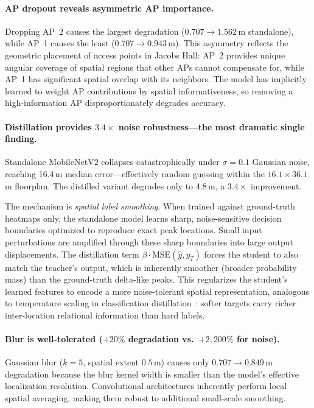 \documentclass[11pt,a4paper]{article}
\begin{document}
\paragraph{AP dropout reveals asymmetric AP importance.}
Dropping AP~2 causes the largest degradation ($0.707 \to 1.562$\,m standalone), while AP~1 causes the least ($0.707 \to 0.943$\,m).
This asymmetry reflects the geometric placement of access points in Jacobs Hall: AP~2 provides unique angular coverage of spatial regions that other APs cannot compensate for, while AP~1 has significant spatial overlap with its neighbors.
The model has implicitly learned to weight AP contributions by spatial informativeness, so removing a high-information AP disproportionately degrades accuracy.

\paragraph{Distillation provides $3.4\times$ noise robustness---the most dramatic single finding.}
Standalone MobileNetV2 collapses catastrophically under $\sigma = 0.1$ Gaussian noise, reaching 16.4\,m median error---effectively random guessing within the $16.1 \times 36.1$\,m floorplan.
The distilled variant degrades only to 4.8\,m, a $3.4\times$ improvement.

The mechanism is \emph{spatial label smoothing}.
When trained against ground-truth heatmaps only, the standalone model learns sharp, noise-sensitive decision boundaries optimized to reproduce exact peak locations.
Small input perturbations are amplified through these sharp boundaries into large output displacements.
The distillation term $\beta \cdot \text{MSE}(\hat{y}, y_T)$ forces the student to also match the teacher's output, which is inherently smoother (broader probability mass) than the ground-truth delta-like peaks.
This regularizes the student's learned features to encode a more noise-tolerant spatial representation, analogous to temperature scaling in classification distillation~\cite{hinton2015distilling}: softer targets carry richer inter-location relational information than hard labels.

\paragraph{Blur is well-tolerated ($+20\%$ degradation vs.\ $+2{,}200\%$ for noise).}
Gaussian blur ($k = 5$, spatial extent $0.5$\,m) causes only $0.707 \to 0.849$\,m degradation because the blur kernel width is smaller than the model's effective localization resolution.
Convolutional architectures inherently perform local spatial averaging, making them robust to additional small-scale smoothing.
\end{document}
